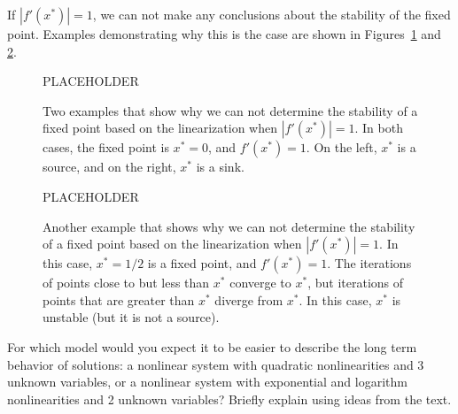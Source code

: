 \bigskip
If $|f'(x^*)|=1$, we can not make any conclusions about the
stability of the fixed point.  Examples demonstrating why this
is the case are shown in Figures~\ref{fig:noconclusion2}
and \ref{fig:noconclusion1}.
%
\begin{figure}
\centerline{%
PLACEHOLDER
}
\caption{Two examples that show why we can not determine
the stability of a fixed point based on the linearization
when
$|f'(x^*)|=1$.  In both cases, the fixed point is $x^*=0$, and $f'(x^*)=1$.
On the left, $x^*$ is a source, and on the right, $x^*$ is a sink.}
\label{fig:noconclusion2}
\end{figure}
%
%
\begin{figure}
\centerline{%
PLACEHOLDER
}
\caption{Another example that shows why we can not determine
the stability of a fixed point based on the linearization
when
$|f'(x^*)|=1$.  In this case, $x^*=1/2$ is a fixed point,
and $f'(x^*)=1$.
The iterations of points close to but less than $x^*$
converge to $x^*$, but iterations of points that are
greater than $x^*$ diverge from $x^*$.
In this case, $x^*$ is unstable (but it is not a source).
}
\label{fig:noconclusion1}
\end{figure}
%
%
% 
%
\begin{exercises}
  \begin{exercise}
    For which model would you expect it to be easier to describe the 
    long term behavior of solutions:
    a nonlinear system with quadratic nonlinearities and 3 unknown variables, or
    a nonlinear system with exponential and logarithm nonlinearities and 2 unknown variables?
    Briefly explain using ideas from the text.
  \end{exercise}
\end{exercises}
%
\newpage
%
